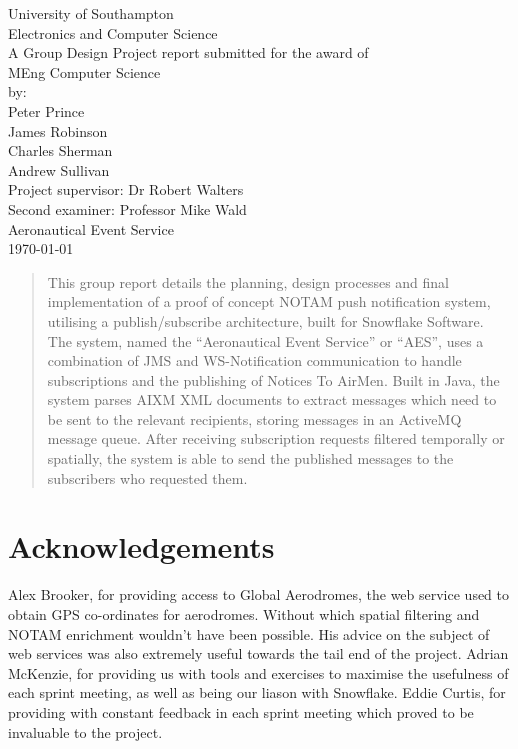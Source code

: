 \documentclass[a4paper, 12pt, twoside]{article}
\begin{document}
\begin{titlepage}

	\center

	{\large University of Southampton}\\[0.2cm]
	{\large Electronics and Computer Science}\\[3cm]

  {\large A Group Design Project report submitted for the award of}\\[0.2cm]
  {\Large MEng Computer Science}\\[3cm]

  {\large by:}\\[0.2cm]
	{\Large Peter Prince}\\[0.2cm]
	{\Large James Robinson}\\[0.2cm]
	{\Large Charles Sherman}\\[0.2cm]
	{\Large Andrew Sullivan}\\[3cm]

  {\large Project supervisor: Dr Robert Walters}\\[0.2cm]
  {\large Second examiner: Professor Mike Wald}\\[3cm]

  {\LARGE Aeronautical Event Service}\\[3cm]
	{\Large \today}\\[3cm]

\end{titlepage}

\begin{abstract}

This group report details the planning, design processes and final implementation of a proof of concept NOTAM push notification system, utilising a publish/subscribe architecture, built for Snowflake Software. The system, named the ``Aeronautical Event Service'' or ``AES'', uses a combination of JMS and WS-Notification communication to handle subscriptions and the publishing of Notices To AirMen. Built in Java, the system parses AIXM XML documents to extract messages which need to be sent to the relevant recipients, storing messages in an ActiveMQ message queue. After receiving subscription requests filtered temporally or spatially, the system is able to send the published messages to the subscribers who requested them.

\end{abstract}

\newpage

\section*{Acknowledgements}
Alex Brooker, for providing access to Global Aerodromes, the web service used to obtain GPS co-ordinates for aerodromes. Without which spatial filtering and NOTAM enrichment wouldn't have been possible. His advice on the subject of web services was also extremely useful towards the tail end of the project.
Adrian McKenzie, for providing us with tools and exercises to maximise the usefulness of each sprint meeting, as well as being our liason with Snowflake.
Eddie Curtis, for providing with constant feedback in each sprint meeting which proved to be invaluable to the project.
\end{document}
